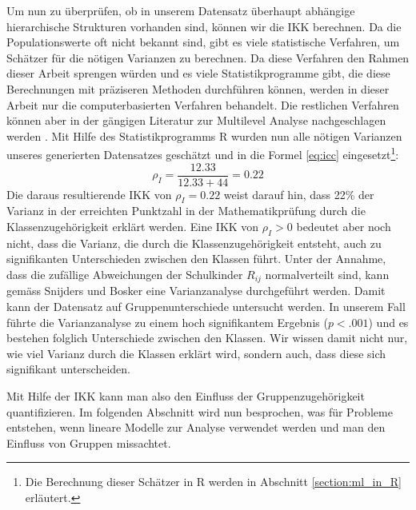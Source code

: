 \documentclass[12pt, a4paper]{article}\usepackage[]{graphicx}\usepackage[]{color}
\begin{document}
Um nun zu überprüfen, ob in unserem Datensatz überhaupt abhängige hierarchische Strukturen vorhanden sind, können wir die IKK berechnen. Da die Populationswerte oft nicht bekannt sind, gibt es viele statistische Verfahren, um Schätzer für die nötigen Varianzen zu berechnen. Da diese Verfahren den Rahmen dieser Arbeit sprengen würden und es viele Statistikprogramme gibt, die diese Berechnungen mit präziseren Methoden durchführen können, werden in dieser Arbeit nur die computerbasierten Verfahren behandelt. Die restlichen Verfahren können aber in der gängigen Literatur zur Multilevel Analyse nachgeschlagen werden \citep[z.B.][]{SnijdersTomA.B2012Ma:a}. Mit Hilfe des Statistikprogramms R wurden nun alle nötigen Varianzen unseres generierten Datensatzes geschätzt und in die Formel \eqref{eq:icc} eingesetzt\footnote{Die Berechnung dieser Schätzer in R werden in Abschnitt \ref{section:ml_in_R} erläutert.}:
\begin{equation} \label{eq:icc_calc}
\rho_{I} = \dfrac{12.33}{12.33 + 44} = 0.22
\end{equation}
Die daraus resultierende IKK von $\rho_{I} = 0.22$ weist darauf hin, dass 22\% der Varianz in der erreichten Punktzahl in der Mathematikprüfung durch die Klassenzugehörigkeit erklärt werden. Eine IKK von $\rho_{I} > 0$ bedeutet aber noch nicht, dass die Varianz, die durch die Klassenzugehörigkeit entsteht, auch zu signifikanten Unterschieden zwischen den Klassen führt. Unter der Annahme, dass die zufällige Abweichungen der Schulkinder $R_{ij}$ normalverteilt sind, kann gemäss Snijders und Bosker \citeyearpar{SnijdersTomA.B2012Ma:a} eine Varianzanalyse durchgeführt werden. Damit kann der Datensatz auf Gruppenunterschiede untersucht werden. In unserem Fall führte die Varianzanalyse zu einem hoch signifikantem Ergebnis ($p<.001$) und es bestehen folglich Unterschiede zwischen den Klassen. Wir wissen damit nicht nur, wie viel Varianz durch die Klassen erklärt wird, sondern auch, dass diese sich signifikant unterscheiden. 

Mit Hilfe der IKK kann man also den Einfluss der Gruppenzugehörigkeit quantifizieren. Im folgenden Abschnitt wird nun besprochen, was für Probleme entstehen, wenn lineare Modelle zur Analyse verwendet werden und man den Einfluss von Gruppen missachtet.
\end{document}

